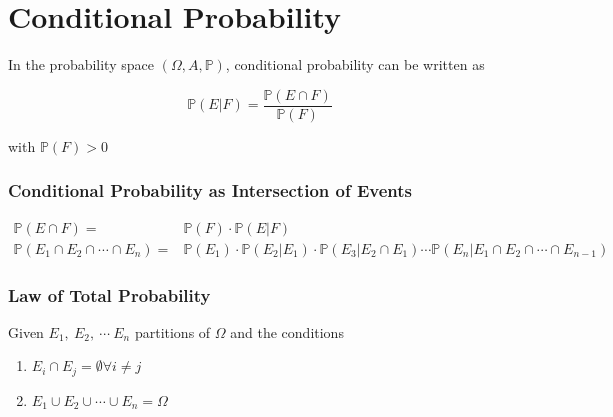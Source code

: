 
\section{Conditional Probability}

    In the probability space \( ( \Omega, A, \mathbb{P} ) \), conditional probability can be written as

    \begin{equation}
        \mathbb{P} (E|F) = \frac{\mathbb{P} (E \cap F)}{\mathbb{P} (F)}
    \end{equation}

    \noindent
    with \(\mathbb{P} (F) > 0\)

        \subsubsection{Conditional Probability as Intersection of Events}

            \begin{equation}
            \begin{split}
                \mathbb{P} (E \cap F) = & \mathbb{P} (F) \cdot \mathbb{P} (E | F) \\
                \mathbb{P} (E_1 \cap E_2 \cap \cdots \cap E_n ) = & \mathbb{P} (E_1) \cdot \mathbb{P} (E_2 | E_1) \cdot \mathbb{P} (E_3 | E_2 \cap E_1) \cdots \mathbb{P} (E_n | E_1 \cap E_2 \cap \cdots \cap E_{n-1})
            \end{split}
            \end{equation}

        \subsubsection{Law of Total Probability}

            Given \(E_1, \ E_2, \ \cdots \ E_n\) partitions of \(\Omega\) and the conditions

            \begin{enumerate}
                \item \(E_i \cap E_j = \emptyset \forall i \neq j\)
                \item \(E_1 \cup E_2 \cup \cdots \cup E_n = \Omega\)
            \end{enumerate}

